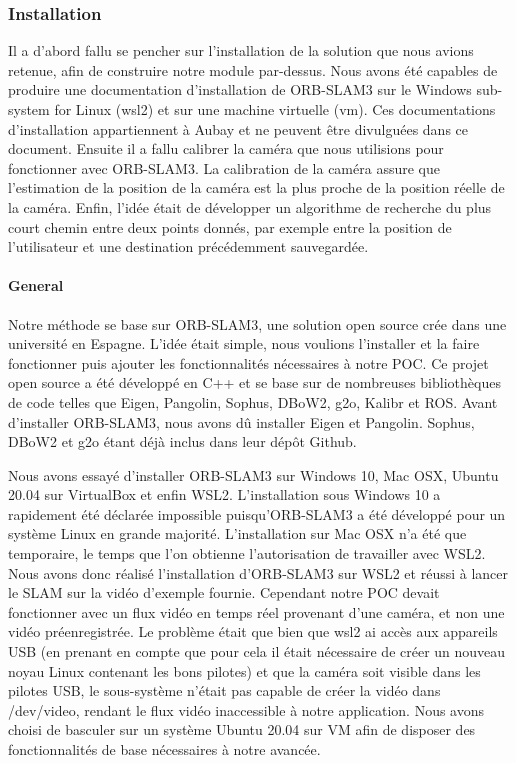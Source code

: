 \documentclass[11pt]{article}
\begin{document}
      \subsubsection{Installation}
        Il a d'abord fallu se pencher sur l'installation de la solution que nous avions retenue, afin de construire notre module par-dessus.
        Nous avons été capables de produire une documentation d'installation de ORB-SLAM3 sur le Windows sub-system for Linux (\acrshort{wsl2})
        et sur une machine virtuelle (\acrshort{vm}). Ces documentations d'installation appartiennent à Aubay et ne peuvent être divulguées dans
        ce document.
        Ensuite il a fallu calibrer la caméra que nous utilisions pour fonctionner avec ORB-SLAM3. 
        La calibration de la caméra assure que l'estimation de la position de la caméra est la plus proche de la position réelle de la caméra.
        Enfin, l'idée était de développer un algorithme de recherche du plus court chemin entre deux points donnés, par exemple entre la position
        de l'utilisateur et une destination précédemment sauvegardée.      
            
        \paragraph{General}
          Notre méthode se base sur ORB-SLAM3, une solution open source crée dans une université en Espagne. L'idée était simple, nous voulions
          l'installer et la faire fonctionner puis ajouter les fonctionnalités nécessaires à notre POC. Ce projet open source a été
          développé en C++ et se base sur de nombreuses bibliothèques de code telles que Eigen, Pangolin, Sophus, DBoW2, g2o, Kalibr et ROS.
          Avant d'installer ORB-SLAM3, nous avons dû installer Eigen et Pangolin. Sophus, DBoW2 et g2o étant déjà inclus dans leur dépôt Github.

          Nous avons essayé d'installer ORB-SLAM3 sur Windows 10, Mac OSX, Ubuntu 20.04 sur VirtualBox et enfin 
          WSL2. L'installation sous Windows 10 a rapidement été déclarée impossible puisqu'ORB-SLAM3
          a été développé pour un système Linux en grande majorité. L'installation sur Mac OSX n'a été que temporaire, le temps que l'on 
          obtienne l'autorisation de travailler avec WSL2.
          Nous avons donc réalisé l'installation d'ORB-SLAM3 sur WSL2 et réussi à lancer le SLAM
          sur la vidéo d'exemple fournie. Cependant notre POC devait fonctionner avec un flux vidéo en temps réel provenant
          d'une caméra, et non une vidéo préenregistrée. Le problème était que bien que wsl2 ai accès aux appareils USB (en prenant en compte 
          que pour cela il était nécessaire de créer un nouveau noyau Linux contenant les bons pilotes) et que la caméra soit visible dans les
          pilotes USB, le sous-système n'était pas capable de créer la vidéo dans /dev/video, rendant le flux vidéo inaccessible à notre
          application. Nous avons choisi de basculer sur un système Ubuntu 20.04 sur VM afin de disposer des fonctionnalités de base
          nécessaires à notre avancée.     
\end{document}
